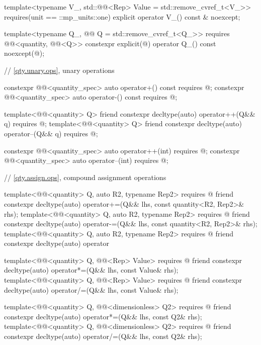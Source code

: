 \begin{codeblock}
{{  template<typename V_, std::@@<Rep> Value = std::remove_cvref_t<V_>>
    requires(unit == ::mp_units::one)
  explicit operator V_() const & noexcept;

  template<typename Q_, @@ Q = std::remove_cvref_t<Q_>>
    requires @@<quantity, @@<Q>>
  constexpr explicit(@\seebelownc@) operator Q_() const noexcept(@\seebelownc@);

  // \ref{qty.unary.ops}, unary operations

  constexpr @@<quantity_spec> auto operator+() const
    requires @\seebelownc@;
  constexpr @@<quantity_spec> auto operator-() const
    requires @\seebelownc@;

  template<@@<quantity> Q>
  friend constexpr decltype(auto) operator++(Q&& q)
    requires @\seebelownc@;
  template<@@<quantity> Q>
  friend constexpr decltype(auto) operator--(Q&& q)
    requires @\seebelownc@;

  constexpr @@<quantity_spec> auto operator++(int)
    requires @\seebelownc@;
  constexpr @@<quantity_spec> auto operator--(int)
    requires @\seebelownc@;

  // \ref{qty.assign.ops}, compound assignment operations

  template<@@<quantity> Q, auto R2, typename Rep2>
    requires @\seebelownc@
  friend constexpr decltype(auto) operator+=(Q&& lhs, const quantity<R2, Rep2>& rhs);
  template<@@<quantity> Q, auto R2, typename Rep2>
    requires @\seebelownc@
  friend constexpr decltype(auto) operator-=(Q&& lhs, const quantity<R2, Rep2>& rhs);
  template<@@<quantity> Q, auto R2, typename Rep2>
    requires @\seebelownc@
  friend constexpr decltype(auto) operator%

  template<@@<quantity> Q, @@<Rep> Value>
    requires @\seebelownc@
  friend constexpr decltype(auto) operator*=(Q&& lhs, const Value& rhs);
  template<@@<quantity> Q, @@<Rep> Value>
    requires @\seebelownc@
  friend constexpr decltype(auto) operator/=(Q&& lhs, const Value& rhs);

  template<@@<quantity> Q, @@<dimensionless> Q2>
    requires @\seebelownc@
  friend constexpr decltype(auto) operator*=(Q&& lhs, const Q2& rhs);
  template<@@<quantity> Q, @@<dimensionless> Q2>
    requires @\seebelownc@
  friend constexpr decltype(auto) operator/=(Q&& lhs, const Q2& rhs);

}}
\end{codeblock}
